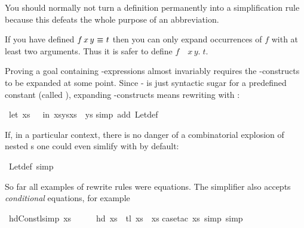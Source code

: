\begin{isabellebody}
\begin{isamarkuptext}
You should normally not turn a definition permanently into a simplification
rule because this defeats the whole purpose of an abbreviation.

\begin{warn}
  If you have defined $f\,x\,y~\emph{$\equiv$}~t$ then you can only expand
  occurrences of $f$ with at least two arguments. Thus it is safer to define
  $f$~\isasymequiv~\isasymlambda$x\,y.\;t$.
\end{warn}%
\end{isamarkuptext}%
%
%
\begin{isamarkuptext}%
Proving a goal containing -expressions almost invariably
requires the -con\-structs to be expanded at some point. Since
- is just syntactic sugar for a predefined constant
(called ), expanding -constructs means rewriting with
:%
\end{isamarkuptext}%
\ {\isachardoublequote}{\isacharparenleft}let\ xs\ {\isacharequal}\ {\isacharbrackleft}{\isacharbrackright}\ in\ xs{\isacharat}ys{\isacharat}xs{\isacharparenright}\ {\isacharequal}\ ys{\isachardoublequote}\isanewline
{}simp\ add{\isacharcolon}\ Let{\isacharunderscore}def{\isacharparenright}\isanewline
{}%
\begin{isamarkuptext}%
If, in a particular context, there is no danger of a combinatorial explosion
of nested s one could even simlify with  by
default:%
\end{isamarkuptext}%
\ Let{\isacharunderscore}def\ {\isacharbrackleft}simp{\isacharbrackright}%
%
\begin{isamarkuptext}%
So far all examples of rewrite rules were equations. The simplifier also
accepts \emph{conditional} equations, for example%
\end{isamarkuptext}%
\ hd{\isacharunderscore}Cons{\isacharunderscore}tl{\isacharbrackleft}simp{\isacharbrackright}{\isacharcolon}\ {\isachardoublequote}xs\ {\isasymnoteq}\ {\isacharbrackleft}{\isacharbrackright}\ \ {\isasymLongrightarrow}\ \ hd\ xs\ {\isacharhash}\ tl\ xs\ {\isacharequal}\ xs{\isachardoublequote}\isanewline
{}case{\isacharunderscore}tac\ xs{\isacharcomma}\ simp{\isacharcomma}\ simp{\isacharparenright}\isanewline

\end{isabellebody}
